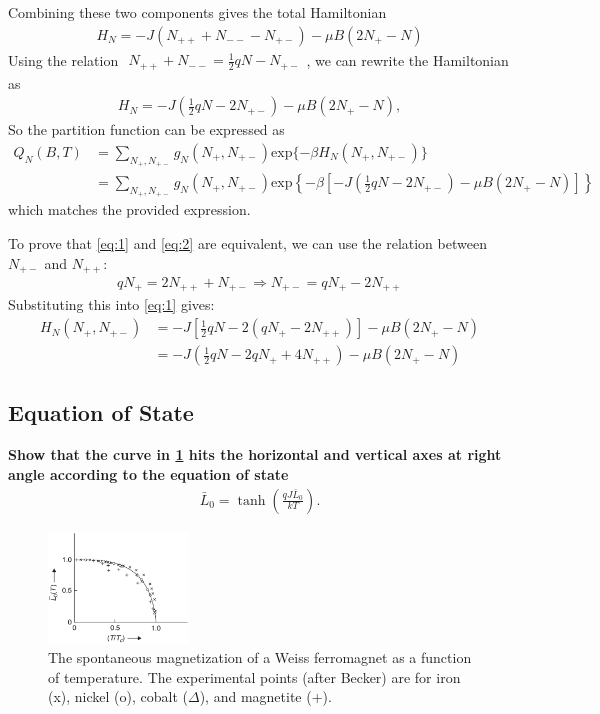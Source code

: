 \documentclass[../../main.tex]{subfiles}
\begin{document}
Combining these two components gives the total Hamiltonian
\begin{align*}
  H_{N} = -J(N_{++}+N_{--}-N_{+-}) - \mu B(2N_{+}-N)
\end{align*}
Using the relation $\begin{aligned}
  N_{++} + N_{--} = \frac{1}{2}qN - N_{+-}
\end{aligned}$, we can rewrite the Hamiltonian as
\begin{align*}
  \boxed{H_{N} = -J\left(\frac{1}{2}qN - 2N_{+-}\right) - \mu B(2N_{+}-N)},
\end{align*}
So the partition function can be expressed as
\begin{align*}
  Q_{N}(B,T) &= \sum_{N_{+},N_{+-}} g_{N}(N_{+},N_{+-}) \text{exp}\{-\beta H_{N}(N_{+},N_{+-})\}\\ 
  &= \sum_{N_{+},N_{+-}} g_{N}(N_{+},N_{+-}) \text{exp}\left\{-\beta \left[-J\left(\frac{1}{2}qN - 2N_{+-}\right) - \mu B(2N_{+}-N)\right]\right\}
\end{align*}
which matches the provided expression.

To prove that \eqref{eq:1} and \eqref{eq:2} are equivalent, we can use the relation between $N_{+-}$ and $N_{++}$:
\begin{align*}
  qN_{+} = 2N_{++} + N_{+-} \Rightarrow N_{+-} = qN_{+} - 2N_{++}
\end{align*}
Substituting this into \eqref{eq:1} gives:
\begin{align*}
  H_{N}(N_{+},N_{+-}) &= -J\left[\frac{1}{2}qN - 2(qN_{+} - 2N_{++})\right] - \mu B(2N_{+}-N)\\
  &= \boxed{-J\left(\frac{1}{2}qN - 2qN_{+} + 4N_{++}\right) - \mu B(2N_{+}-N)}
\end{align*}

\subsection{Equation of State}
\textbf{Show that the curve in \ref{fig:12.7} hits the horizontal and vertical axes at right angle according to the equation of state 
  \begin{align*}
    \bar{L}_{0} = \tanh{\left(\frac{qJ\bar{L}_{0}}{kT}\right)}.
  \end{align*}}
  
  	\begin{figure} 
		\centering
		\includegraphics[width=0.33\textwidth,height=0.3\textwidth]{fig/fig.png}
    \caption{The spontaneous magnetization of a Weiss ferromagnet as a function of temperature. The experimental points (after Becker) are for iron (x), nickel (o), cobalt ($\Delta$), and magnetite (+).} \label{fig:12.7}
	\end{figure}
\end{document}
